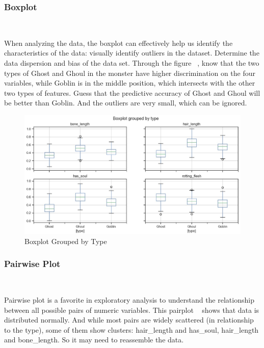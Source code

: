 \subsubsection{Boxplot}
\
 
When analyzing the data, 
the boxplot can effectively 
help us identify the characteristics of the data: 
visually identify outliers in the dataset. 
Determine the data dispersion and 
bias of the data set. 
Through the figure ~, 
know that the two types of Ghost and Ghoul 
in the monster have higher discrimination 
on the four variables, 
while Goblin is in the middle position, 
which intersects with the other two types of features.
Guess that the predictive accuracy of Ghost and Ghoul 
will be better than Goblin.
And the outliers are very small,
which can be ignored.


\begin{figure}[htbp]
	\centering
	\includegraphics[scale=0.3]{figures/boxplot.eps}
	\caption{Boxplot Grouped by Type}\label{fig:boxplot}
\end{figure}


\subsubsection{Pairwise Plot} 
\

Pairwise plot is 
a favorite in exploratory analysis 
to understand the relationship 
between all possible pairs 
of numeric variables. 
This pairplot ~ 
shows that data is distributed normally. 
And while most pairs are widely scattered 
(in relationship to the type), 
some of them show clusters: 
hair_length and has_soul, 
hair_length and bone_length. 
So it may need to reassemble the data.

